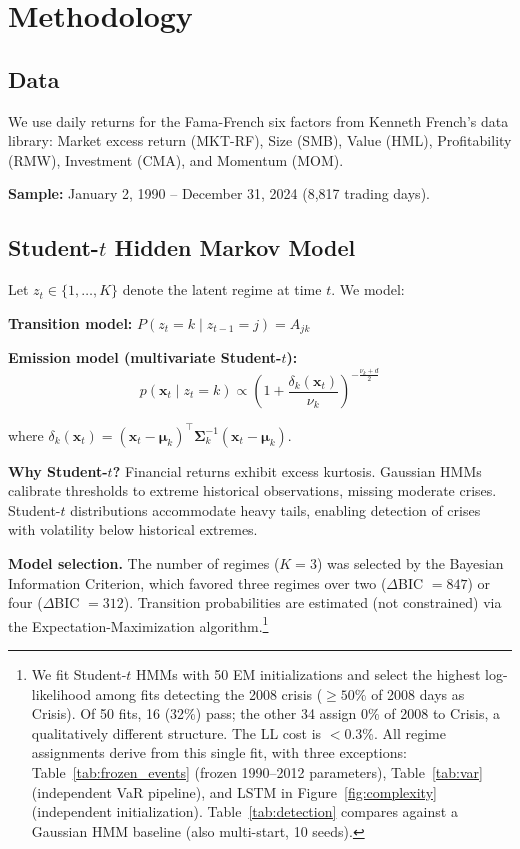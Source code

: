 \documentclass{uai2026}
\begin{document}
\section{Methodology}

\subsection{Data}

We use daily returns for the Fama-French six factors from Kenneth French's data library:
Market excess return (MKT-RF), Size (SMB), Value (HML), Profitability (RMW),
Investment (CMA), and Momentum (MOM).

\textbf{Sample:} January 2, 1990 -- December 31, 2024 (8,817 trading days).

\subsection{Student-\texorpdfstring{$t$}{t} Hidden Markov Model}
\label{sec:hmm}

Let $z_t \in \{1, \ldots, K\}$ denote the latent regime at time $t$. We model:

\textbf{Transition model:}
$P(z_t = k \mid z_{t-1} = j) = A_{jk}$

\textbf{Emission model (multivariate Student-$t$):}
\begin{equation}
p(\mathbf{x}_t \mid z_t = k) \propto \left(1 + \frac{\delta_k(\mathbf{x}_t)}{\nu_k}\right)^{-\frac{\nu_k+d}{2}}
\end{equation}

where $\delta_k(\mathbf{x}_t) = (\mathbf{x}_t - \boldsymbol{\mu}_k)^\top\boldsymbol{\Sigma}_k^{-1}(\mathbf{x}_t - \boldsymbol{\mu}_k)$.

\textbf{Why Student-$t$?} Financial returns exhibit excess kurtosis. Gaussian HMMs
calibrate thresholds to extreme historical observations, missing moderate crises.
Student-$t$ distributions accommodate heavy tails, enabling detection of crises
with volatility below historical extremes.

\textbf{Model selection.} The number of regimes ($K=3$) was selected by the Bayesian
Information Criterion, which favored three regimes over two ($\Delta$BIC $= 847$) or
four ($\Delta$BIC $= 312$). Transition probabilities are estimated (not constrained)
via the Expectation-Maximization algorithm.\footnote{We fit Student-$t$ HMMs
with 50 EM initializations and select the highest log-likelihood among fits
detecting the 2008 crisis ($\geq 50\%$ of 2008 days as Crisis). Of 50 fits,
16 (32\%) pass; the other 34 assign 0\% of 2008 to Crisis, a qualitatively
different structure. The LL cost is $<$0.3\%. All regime assignments derive
from this single fit, with three exceptions: Table~\ref{tab:frozen_events}
(frozen 1990--2012 parameters), Table~\ref{tab:var} (independent VaR pipeline),
and LSTM in Figure~\ref{fig:complexity} (independent initialization).
Table~\ref{tab:detection} compares against a Gaussian HMM baseline
(also multi-start, 10 seeds).}
\end{document}
